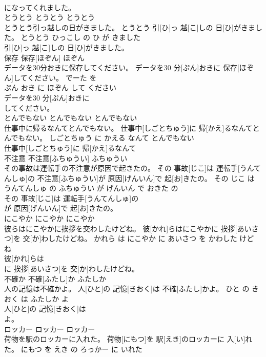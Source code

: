 \documentclass[8pt]{extreport}
\begin{document}
\begin{CJK}{UTF8}{min}
\\	になってくれました。			
\\	とうとう	とうとう	とうとう	
\\	とうとう引っ越しの日がきました。	とうとう 引[ひ]っ 越[こ]しの 日[ひ]がきました。	とうとう ひっこし の ひ が きました	
\\	引[ひ]っ 越[こ]しの 日[ひ]がきました。			
\\	保存	保存[ほぞん]	ほぞん	
\\	データを30分おきに保存してください。	データを30 分[ぷん]おきに 保存[ほぞん]してください。	でーた を 
\\	ぷん おき に ほぞん して ください	
\\	データを30 分[ぷん]おきに
\\	してください。			
\\	とんでもない	とんでもない	とんでもない	
\\	仕事中に帰るなんてとんでもない。	仕事中[しごとちゅう]に 帰[かえ]るなんてとんでもない。	しごとちゅう に かえる なんて とんでもない	
\\	仕事中[しごとちゅう]に 帰[かえ]るなんて
\\	不注意	不注意[ふちゅうい]	ふちゅうい	
\\	その事故は運転手の不注意が原因で起きたの。	その 事故[じこ]は 運転手[うんてんしゅ]の 不注意[ふちゅうい]が 原因[げんいん]で 起[お]きたの。	その じこ は うんてんしゅ の ふちゅうい が げんいん で おきた の	
\\	その 事故[じこ]は 運転手[うんてんしゅ]の
\\	が 原因[げんいん]で 起[お]きたの。			
\\	にこやか	にこやか	にこやか	
\\	彼らはにこやかに挨拶を交わしたけどね。	彼[かれ]らはにこやかに 挨拶[あいさつ]を 交[か]わしたけどね。	かれら は にこやか に あいさつ を かわした けど ね	
\\	彼[かれ]らは
\\	に 挨拶[あいさつ]を 交[か]わしたけどね。			
\\	不確か	不確[ふたし]か	ふたしか	
\\	人の記憶は不確かよ。	人[ひと]の 記憶[きおく]は 不確[ふたし]かよ。	ひと の きおく は ふたしか よ	
\\	人[ひと]の 記憶[きおく]は
\\	よ。			
\\	ロッカー	ロッカー	ロッカー	
\\	荷物を駅のロッカーに入れた。	荷物[にもつ]を 駅[えき]のロッカーに 入[い]れた。	にもつ を えき の ろっかー に いれた	

\end{CJK}
\end{document}
